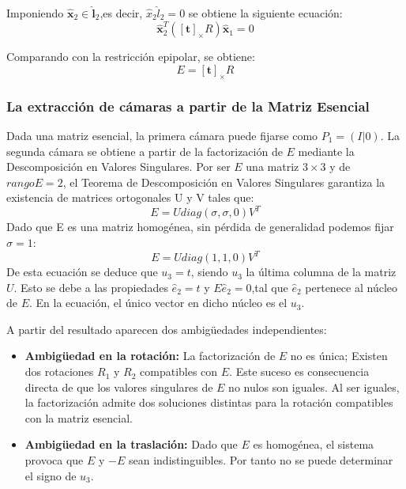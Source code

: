\documentclass[
10pt, %
a4paper, %
oneside, %
headinclude,footinclude, %
BCOR=5mm, %
]{scrartcl}
\begin{document}
Imponiendo $\mathbf{\hat{x}}_2 \in \mathbf{\hat{l}}_2$,es decir, ${\hat{x}}_2\hat{l}_2=0$ se obtiene la siguiente ecuación:
\begin{equation}
    \mathbf{\hat{x}}_2^T \left( [\mathbf{t}]_\times R \right) \mathbf{\hat{x}}_1 = 0
\end{equation}

Comparando con la restricción epipolar, se obtiene: 
\begin{equation}
    E = [\mathbf{t}]_\times R
\end{equation}

\subsubsection{La extracción de cámaras a partir de la Matriz Esencial}Dada una matriz esencial, la primera cámara puede fijarse como $P_1=(I|0)$. La segunda cámara se obtiene a partir de la factorización de $E$ mediante la Descomposición en Valores Singulares. Por ser $E$ una matriz $3 \times 3$ y de $rangoE=2$, el Teorema de Descomposición en Valores Singulares garantiza la existencia de matrices ortogonales U y V tales que:
\begin{equation}
    E = Udiag(\sigma,\sigma,0)V^T 
\end{equation}
Dado que E es una matriz homogénea, sin pérdida de generalidad podemos fijar $\sigma=1$:
\begin{equation}
    E = Udiag(1,1,0)V^T 
\end{equation}
De esta ecuación se deduce que $u_3=t$, siendo $u_3$ la última columna de la matriz $U$. Esto se debe a las propiedades $\hat{e}_2=t$ y $E\hat{e}_2=0$,tal que $\hat{e}_2$ pertenece al núcleo de $E$. En la ecuación, el único vector en dicho núcleo es el $u_3$. 

A partir del resultado aparecen dos ambigüedades independientes:
\begin{itemize}
    \item \textbf{Ambigüedad en la rotación:} La factorización de $E$ no es única; Existen dos rotaciones $R_1$ y $R_2$ compatibles con $E$. Este suceso es consecuencia directa de que los valores singulares de $E$ no nulos son iguales. Al ser iguales, la factorización admite dos soluciones distintas para la rotación compatibles con la matriz esencial.
    \item \textbf{Ambigüedad en la traslación:} Dado que $E$ es homogénea, el sistema provoca que $E$ y $-E$ sean indistinguibles. Por tanto no se puede determinar el signo de $u_3$. 
\end{itemize}
\end{document}
